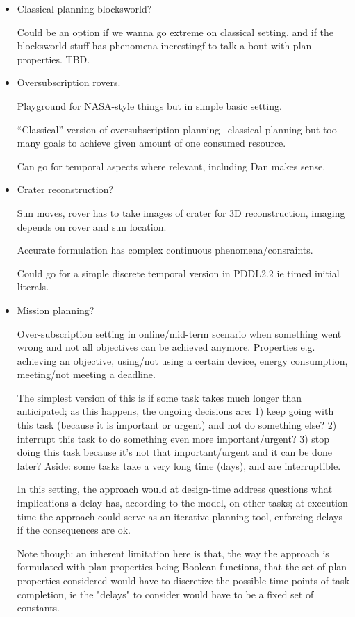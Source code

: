 \begin{itemize}
\item Classical planning blocksworld?

  Could be an option if we wanna go extreme on classical setting, and
  if the blocksworld stuff has phenomena inerestingf to talk a bout
  with plan properties. TBD.

\item Oversubscription rovers.

  Playground for NASA-style things but in simple basic setting.

  ``Classical'' version of oversubscription planning \ie\ classical
  planning but too many goals to achieve given amount of one consumed
  resource.

  Can go for temporal aspects where relevant, including Dan makes
  sense.

\item Crater reconstruction?

  Sun moves, rover has to take images of crater for 3D reconstruction,
  imaging depends on rover and sun location.

  Accurate formulation has complex continuous phenomena/consraints.

  Could go for a simple discrete temporal version in PDDL2.2 ie timed
  initial literals.

\item Mission planning?

  Over-subscription setting in online/mid-term scenario when something
  went wrong and not all objectives can be achieved
  anymore. Properties e.g. achieving an objective, using/not using a
  certain device, energy consumption, meeting/not meeting a deadline.

  The simplest version of this is if some task takes much longer than
  anticipated; as this happens, the ongoing decisions are: 1) keep
  going with this task (because it is important or urgent) and not do
  something else?  2) interrupt this task to do something even more
  important/urgent?  3) stop doing this task because it's not that
  important/urgent and it can be done later? Aside: some tasks take a
  very long time (days), and are interruptible.

  In this setting, the approach would at design-time address questions
  what implications a delay has, according to the model, on other
  tasks; at execution time the approach could serve as an iterative
  planning tool, enforcing delays if the consequences are ok.

  Note though: an inherent limitation here is that, the way the
  approach is formulated with plan properties being Boolean functions,
  that the set of plan properties considered would have to discretize
  the possible time points of task completion, ie the "delays" to
  consider would have to be a fixed set of constants.

\end{itemize}



